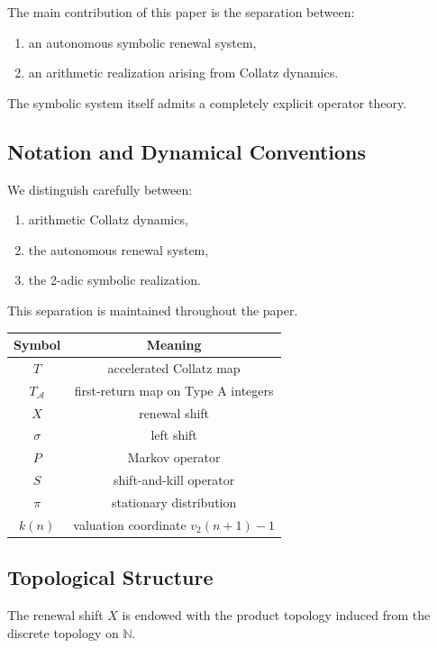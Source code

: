 \documentclass[11pt]{article}
\begin{document}
The main contribution of this paper is the separation between:
\begin{enumerate}[label=(\roman*)]
\item an autonomous symbolic renewal system,
\item an arithmetic realization arising from Collatz dynamics.
\end{enumerate}

The symbolic system itself admits a completely explicit operator theory.

\subsection{Notation and Dynamical Conventions}

We distinguish carefully between:
\begin{enumerate}[label=(\arabic*)]
\item arithmetic Collatz dynamics,
\item the autonomous renewal system,
\item the 2-adic symbolic realization.
\end{enumerate}

This separation is maintained throughout the paper.

\begin{center}
\begin{tabular}{c|c}
Symbol & Meaning \\
\hline
\(T\) & accelerated Collatz map \\
\(T_{\mathcal A}\) & first-return map on Type A integers \\
\(X\) & renewal shift \\
\(\sigma\) & left shift \\
\(P\) & Markov operator \\
\(S\) & shift-and-kill operator \\
\(\pi\) & stationary distribution \\
\(k(n)\) & valuation coordinate \(v_2(n+1)-1\)
\end{tabular}
\end{center}

\subsection{Topological Structure}

The renewal shift \(X\) is endowed with the product topology induced from the
discrete topology on \(\mathbb N\).
\end{document}
